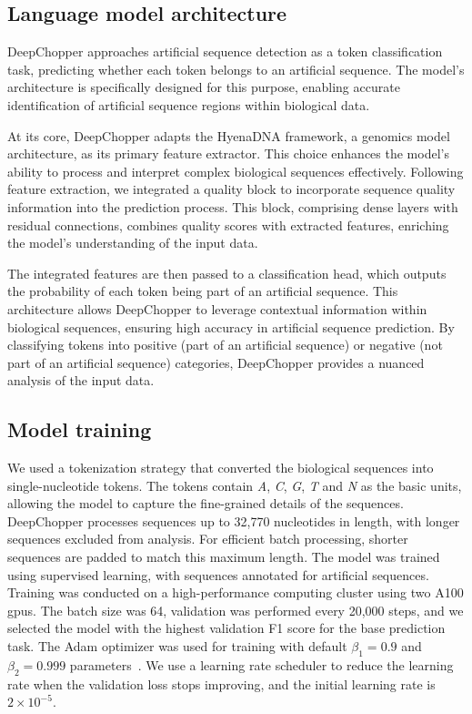 \documentclass[pdflatex, sn-mathphys-num, lineno]{sn-jnl}%
\theoremstyle{thmstyleone}%
\theoremstyle{thmstyletwo}%
\theoremstyle{thmstylethree}%
\begin{document}
\subsection{Language model architecture}\label{ssec:lm}

DeepChopper approaches artificial sequence detection as a token classification task, predicting whether each token belongs to an artificial sequence.
The model's architecture is specifically designed for this purpose, enabling accurate identification of artificial sequence regions within biological data.

At its core, DeepChopper adapts the HyenaDNA framework, a genomics model architecture, as its primary feature extractor.
This choice enhances the model's ability to process and interpret complex biological sequences effectively.
Following feature extraction, we integrated a quality block to incorporate sequence quality information into the prediction process.
This block, comprising dense layers with residual connections, combines quality scores with extracted features, enriching the model's understanding of the input data.

The integrated features are then passed to a classification head, which outputs the probability of each token being part of an artificial sequence.
This architecture allows DeepChopper to leverage contextual information within biological sequences, ensuring high accuracy in artificial sequence prediction.
By classifying tokens into positive (part of an artificial sequence) or negative (not part of an artificial sequence) categories, DeepChopper provides a nuanced analysis of the input data.


\subsection{Model training}\label{ssec:training}

We used a tokenization strategy that converted the biological sequences into single-nucleotide tokens.
The tokens contain \emph{A}, \emph{C}, \emph{G}, \emph{T} and \emph{N} as the basic units, allowing the model to capture the fine-grained details of the sequences.
DeepChopper processes sequences up to 32,770 nucleotides in length, with longer sequences excluded from analysis.
For efficient batch processing, shorter sequences are padded to match this maximum length.
The model was trained using supervised learning, with sequences annotated for artificial sequences.
Training was conducted on a high-performance computing cluster using two A100 \glspl{gpu}.
The batch size was 64, validation was performed every 20,000 steps, and we selected the model with the highest validation F1 score for the base prediction task.
The Adam optimizer was used for training with default \( \beta_{1} = 0.9 \) and \( \beta_{2} = 0.999 \) parameters~\cite{kingma2014adam}.
We use a learning rate scheduler to reduce the learning rate when the validation loss stops improving, and the initial learning rate is \( 2 \times 10^{-5} \).
\end{document}
